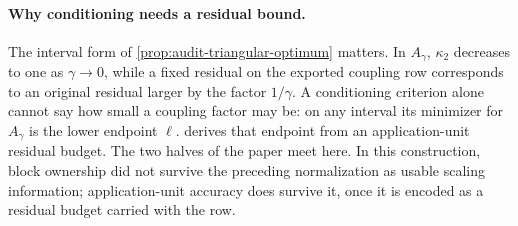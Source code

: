 \paragraph{Why conditioning needs a residual bound.}
The interval form of \cref{prop:audit-triangular-optimum} matters. In $A_\gamma$,
$\kappa_2$ decreases to one as $\gamma\to0$, while a fixed residual on the exported coupling
row corresponds to an original residual larger by the factor $1/\gamma$. A conditioning
criterion alone cannot say how small a coupling factor may be: on any interval its
minimizer for $A_\gamma$ is the lower endpoint $\ell$.  derives that
endpoint from an application-unit residual budget. The two halves of the paper meet here.
In this construction, block ownership did not survive the preceding normalization as usable
scaling information;
application-unit accuracy does survive it, once it is encoded as a residual budget carried
with the row.
